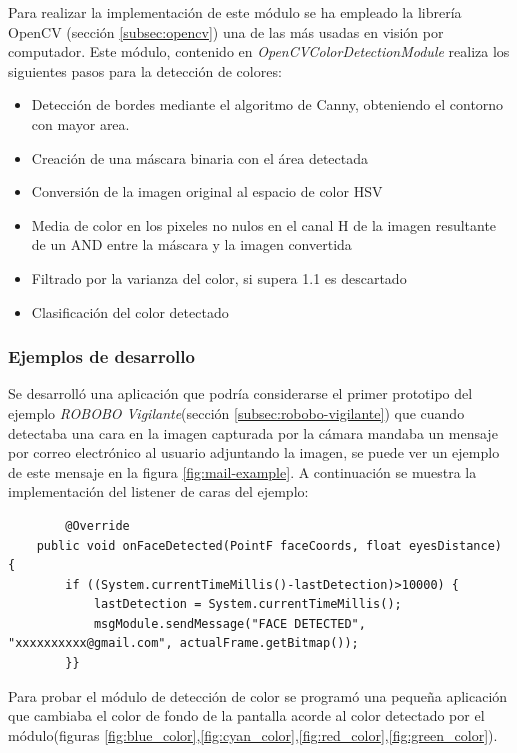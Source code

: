 Para realizar la implementación de este módulo se ha empleado la librería OpenCV\cite{itseez2015opencv} (sección \ref{subsec:opencv}) una de las más usadas en visión por computador. Este módulo, contenido en \textit{OpenCVColorDetectionModule} realiza los siguientes pasos para la detección de colores:
\begin{itemize}
	\item Detección de bordes mediante el algoritmo de Canny, obteniendo el contorno con mayor area.
	\item Creación de una máscara binaria con el área detectada
	\item Conversión de la imagen original al espacio de color HSV
	\item Media de color en los pixeles no nulos en el canal H de la imagen resultante de un AND entre la máscara y la imagen convertida
	\item Filtrado por la varianza del color, si supera 1.1 es descartado
	\item Clasificación del color detectado
\end{itemize}

\subsubsection*{Ejemplos de desarrollo}

Se desarrolló una aplicación que podría considerarse el primer prototipo del ejemplo \textit{ROBOBO Vigilante}(sección \ref{subsec:robobo-vigilante}) que cuando detectaba una cara en la imagen capturada por la cámara mandaba un mensaje por correo electrónico al usuario adjuntando la imagen, se puede ver un ejemplo de este mensaje en la figura \ref{fig:mail-example}.
A continuación se muestra la implementación del listener de caras del ejemplo:

\begin{lstlisting}
	    @Override
    public void onFaceDetected(PointF faceCoords, float eyesDistance) {
        if ((System.currentTimeMillis()-lastDetection)>10000) {
            lastDetection = System.currentTimeMillis();
            msgModule.sendMessage("FACE DETECTED", "xxxxxxxxxx@gmail.com", actualFrame.getBitmap());
        }}
\end{lstlisting}


Para probar el módulo de detección de color se programó una pequeña aplicación que cambiaba el color de fondo de la pantalla acorde al color detectado por el módulo(figuras \ref{fig:blue_color},\ref{fig:cyan_color},\ref{fig:red_color},\ref{fig:green_color}).


